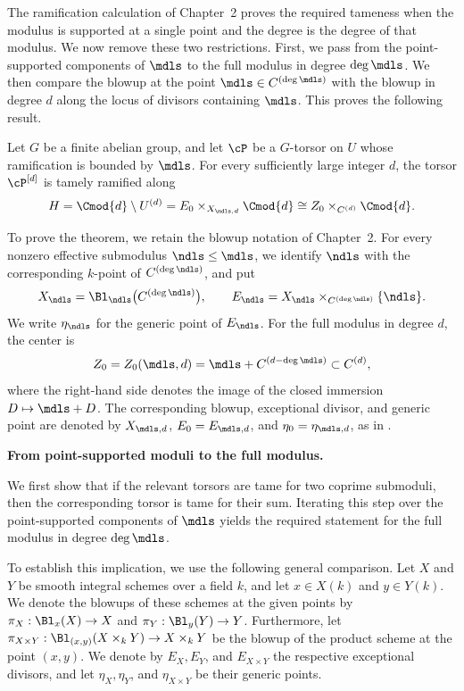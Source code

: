 The ramification calculation of Chapter~2 proves the required tameness when
the modulus is supported at a single point and the degree is the degree of
that modulus. We now remove these two restrictions. First, we pass from the
point-supported components of $\mdls$ to the full modulus in degree
$\deg\mdls$. We then compare the blowup at the point
$\mdls\in C^{(\deg\mdls)}$ with the blowup in degree $d$ along the locus of
divisors containing $\mdls$. This proves the following result.

\begin{theorem}\label{theorem:SymmetricPowerOfSheafIsTamelyRamified}
Let $G$ be a finite abelian group, and let $\cP$ be a $G$-torsor on $U$
whose ramification is bounded by $\mdls$. For every sufficiently large
integer $d$, the torsor $\cP^{[d]}$ is tamely ramified along
\[
H=\Cmod{d}\setminus U^{(d)}
  =E_0\times_{X_{\mdls,d}}\Cmod{d}
  \cong Z_0\times_{C^{(d)}}\Cmod{d}.
\]
\end{theorem}

To prove the theorem, we retain the blowup notation of Chapter~2. For every
nonzero effective submodulus $\ndls\leq\mdls$, we identify $\ndls$ with the
corresponding $k$-point of $C^{(\deg\ndls)}$, and put
\[
    X_{\ndls}=\Bl_{\ndls}\bigl(C^{(\deg\ndls)}\bigr),
    \qquad
    E_{\ndls}=X_{\ndls}\times_{C^{(\deg\ndls)}}\{\ndls\}.
\]
We write $\eta_{\ndls}$ for the generic point of $E_{\ndls}$. For the full
modulus in degree $d$, the center is
\[
Z_0=Z_0(\mdls,d)=\mdls+C^{(d-\deg\mdls)}\subset C^{(d)},
\]
where the right-hand side denotes the image of the closed immersion
$D\mapsto\mdls+D$.
The corresponding blowup, exceptional divisor, and generic point are denoted
by $X_{\mdls,d}$, $E_0=E_{\mdls,d}$, and
$\eta_0=\eta_{\mdls,d}$, as in
.

\noindent\textbf{From point-supported moduli to the full modulus.}

We first show that if the relevant torsors are tame for two coprime
submoduli, then the corresponding torsor is tame for their sum. Iterating
this step over the point-supported components of $\mdls$ yields the required
statement for the full modulus in degree $\deg\mdls$.

To establish this implication, we use the following general comparison. Let
$X$ and $Y$ be smooth integral schemes over a field $k$, and let
$x\in X(k)$ and $y\in Y(k)$.
We denote the blowups of these schemes at the given points by
$\pi_X: \Bl_x(X) \to X$ and $\pi_Y: \Bl_y(Y) \to Y$. Furthermore, let $\pi_{X \times Y}: \Bl_{(x,y)}(X \times_k Y) \to X \times_k Y$
be the blowup of the product scheme at the point $(x,y)$.
We denote by $E_X, E_Y$, and $E_{X \times Y}$ the respective exceptional divisors, and let $\eta_X, \eta_Y$, and $\eta_{X \times Y}$ be their generic points.

